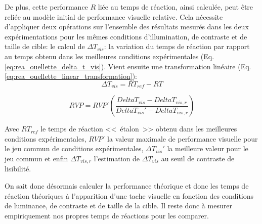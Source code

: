 	\par De plus, cette performance $R$ liée au temps de réaction, ainsi calculée, peut être reliée au modèle initial de performance visuelle relative. Cela nécessite d'appliquer deux opérations sur l'ensemble des résultats mesurés dans les deux expérimentations pour les mêmes conditions d'illumination, de contraste et de taille de cible: le calcul de $\Delta T_{vis}$: la variation du temps de réaction par rapport au temps obtenu dans les meilleures conditions expérimentales (Eq. \ref{eq:rea_ouellette_delta_t_vis}). Vient ensuite une transformation linéaire (Eq. \ref{eq:rea_ouellette_linear_transformation}):
	\begin{equation}
		\Delta T_{vis} = RT_{ref} - RT
		\label{eq:rea_ouellette_delta_t_vis}
	\end{equation}
	
	\begin{equation}
		RVP = RVP' \left(\frac{Delta T_{vis} - Delta T_{vis,r}}{Delta T_{vis}' - Delta T_{vis,r}}\right)
		\label{eq:rea_ouellette_linear_transformation}
	\end{equation}
	
	\par Avec $RT_{ref}$ le temps de réaction <<~étalon~>> obtenu dans les meilleures conditions expérimentales, $RVP'$ la valeur maximale de performance visuelle pour le jeu commun de conditions expérimentales, $\Delta T_{vis}'$ la meilleure valeur pour le jeu commun et enfin $\Delta T_{vis,r}$ l'estimation de $\Delta T_{vis}$ au seuil de contraste de lisibilité.
	
	\par On sait donc désormais calculer la performance théorique et donc les temps de réaction théoriques à l'apparition d'une tache visuelle en fonction des conditions de luminance, de contraste et de taille de la cible. Il reste donc à mesurer empiriquement nos propres temps de réactions pour les comparer.
